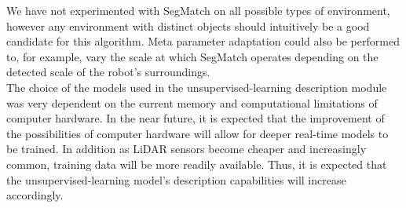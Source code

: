 We have not experimented with SegMatch on all possible types of environment, however any environment with distinct objects should intuitively be a good candidate for this algorithm. Meta parameter adaptation could also be performed to, for example, vary the scale at which SegMatch operates depending on the detected scale of the robot's surroundings.\\

The choice of the models used in the unsupervised-learning description module was very dependent on the current memory and computational limitations of computer hardware. In the near future, it is expected that the improvement of the possibilities of computer hardware will allow for deeper real-time models to be trained. In addition as LiDAR sensors become cheaper and increasingly common, training data will be more readily available. Thus, it is expected that the unsupervised-learning model's description capabilities will increase accordingly.
